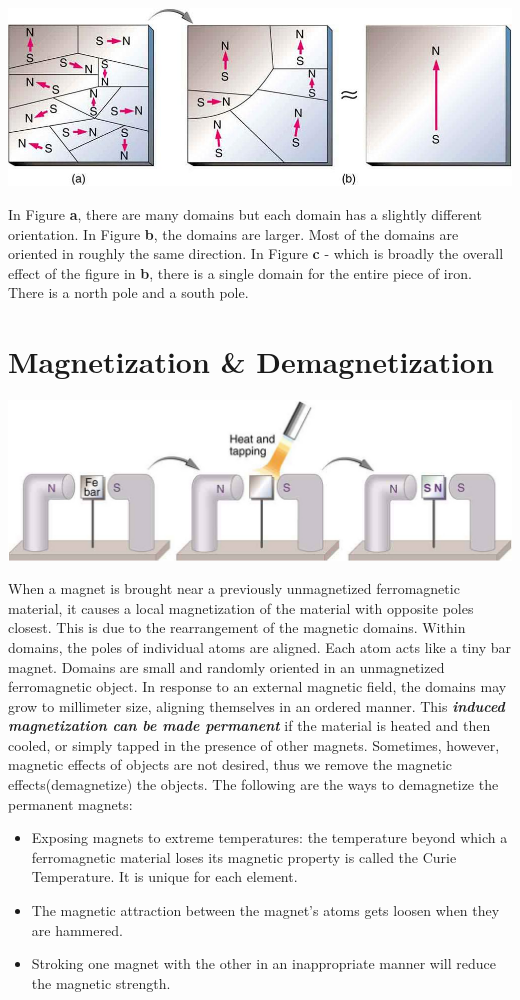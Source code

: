 \documentclass[9pt]{exam}
\begin{document}
	\begin{center}
		\includegraphics[scale=0.2]{magnetic_domains}
	\end{center}
	In Figure \textbf{a}, there are many domains but each domain has a slightly different orientation. In Figure \textbf{b}, the domains are larger. Most of the domains are oriented in roughly the same direction. In Figure \textbf{c} - which is broadly the overall effect of the figure in \textbf{b}, there is a single domain for the entire piece of iron. There is a north pole and a south pole.
	\section*{Magnetization \& Demagnetization}
	\begin{center}
		\includegraphics[scale=0.3]{magnetization}
	\end{center}
	When a magnet is brought near a previously unmagnetized ferromagnetic material, it causes a local magnetization of the material with opposite poles closest. This is due to the rearrangement of the magnetic domains. Within domains, the poles of individual atoms are aligned. Each atom acts like a tiny bar magnet. Domains are small and randomly oriented in an unmagnetized ferromagnetic object. In response to an external magnetic field, the domains may grow to millimeter size, aligning themselves in an ordered manner. This \textit{\textbf{induced magnetization can be made permanent}} if the material is heated and then cooled, or simply tapped in the presence of other magnets. Sometimes, however, magnetic effects of objects are not desired, thus we remove the magnetic effects(demagnetize) the objects. The following are the ways to demagnetize the permanent magnets:
	\begin{itemize}
		\item Exposing magnets to extreme temperatures: the temperature beyond which a ferromagnetic material loses its magnetic property is called the Curie Temperature. It is unique for each element.
		\item The magnetic attraction between the magnet’s atoms gets loosen when they are hammered.
		\item Stroking one magnet with the other in an inappropriate manner will reduce the magnetic strength.
	\end{itemize} 
\end{document}
